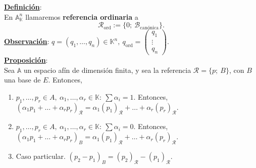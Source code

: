 \documentclass[11pt]{article}
\newcommand{\af}{\mathbb{A}}
\newcommand{\defi}{\underline{\textbf{Definición}}:\\}
\newcommand{\prop}{\underline{\textbf{Proposición}}:\\}
\newcommand{\obs}{\underline{\textbf{Observación}}: }
\begin{document}
\defi En $\af^n_{\mathbb{K}}$ llamaremos \textbf{referencia ordinaria} a
$$
\mathcal{R}_{\textrm{ord}}:=\{0;\ \mathcal{B}_{\textrm{canónica}}\}.
$$
\obs $q=(q_1,\ldots,q_n)\in\mathbb{K}^n,\ q_{\textrm{ord}}=\begin{pmatrix}
q_1\\
\vdots\\
q_n
\end{pmatrix}.$\\
\prop Sea $\af$ un espacio afín de dimensión finita, y sea la referencia $\mathcal{R}=\{p;\ B\}$, con $B$ una base de $E$. Entonces,
\begin{enumerate}
	\item $p_1,\ldots,p_r\in A,\ \alpha_1,\ldots,\alpha_r\in\mathbb{K}:\ \sum\alpha_i=1.$ Entonces, 
	$(\alpha_1p_1+\ldots+\alpha_rp_r)_{\mathcal{R}}=\alpha_1(p_1)_{\mathcal{R}}+\ldots+\alpha_r(p_r)_{\mathcal{R}}.$
	\item $p_1,\ldots,p_r\in A,\ \alpha_1,\ldots,\alpha_r\in\mathbb{K}:\ \sum\alpha_i=0.$ Entonces, 
	$(\alpha_1p_1+\ldots+\alpha_rp_r)_B=\alpha_1(p_1)_{\mathcal{R}}+\ldots+\alpha_r(p_r)_{\mathcal{R}}.$
	\item Caso particular. $(p_2-p_1)_B=(p_2)_{\mathcal{R}}-(p_1)_{\mathcal{R}}.$
\end{enumerate}
\newpage

\newpage
\end{document}
